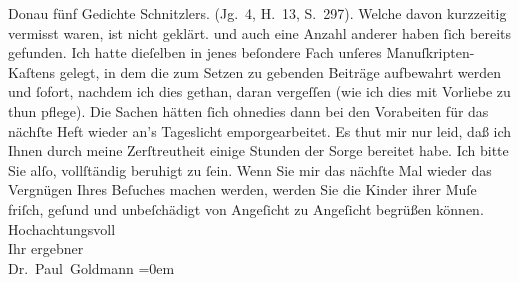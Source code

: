 \begin{ledgroupsized}[t]{13cm}
{{{{                     Donau} fünf Gedichte Schnitzlers.
                     (Jg. 4, H. 13, S. 297). Welche davon kurzzeitig vermisst
                  waren, ist nicht geklärt.}}}\label{K_L02640-1h} und auch eine Anzahl anderer haben ſich bereits
               gefunden. Ich hatte dieſelben in jenes beſondere Fach unſeres Manuſkripten-Kaſtens
               gelegt, in dem die zum Setzen zu gebenden Beiträge aufbewahrt werden und ſofort,
               nachdem ich dies gethan, daran vergeſſen (wie ich dies mit {\pb}Vorliebe zu thun pflege). Die Sachen
               hätten ſich ohnedies dann bei den Vorabeiten für das nächſte Heft wieder an’s Tageslicht
               emporgearbeitet. Es thut mir nur leid, daß ich Ihnen durch meine Zerſtreutheit einige
               Stunden der Sorge bereitet habe. Ich bitte Sie alſo, vollſtändig beruhigt \introOben{}zu\introOben{} ſein. Wenn Sie mir das nächſte Mal wieder das Vergnügen
               Ihres Beſuches machen werden, werden Sie die Kinder ihrer Muſe friſch, geſund und unbeſchädigt von
               Angeſicht zu Angeſicht begrüßen können.\pend
           \pstart
           Hochachtungsvoll {\\[\baselineskip]}Ihr ergebner {\\[\baselineskip]}\spacefill\mbox{Dr. Paul Goldmann}\pend
           \leftskip=0em{}\endnumbering{}\end{ledgroupsized}  \newcommand{\dateiname}{L02640}\newcommand{\titel}{Paul Goldmann an Arthur Schnitzler, 18. 6. 1889}\newcommand{\editorInnen}{Martin Anton Müller und Laura Untner}
            \footnotesize
\begin{ledgroupsized}[t]{11.5cm}
\end{ledgroupsized}
         
      